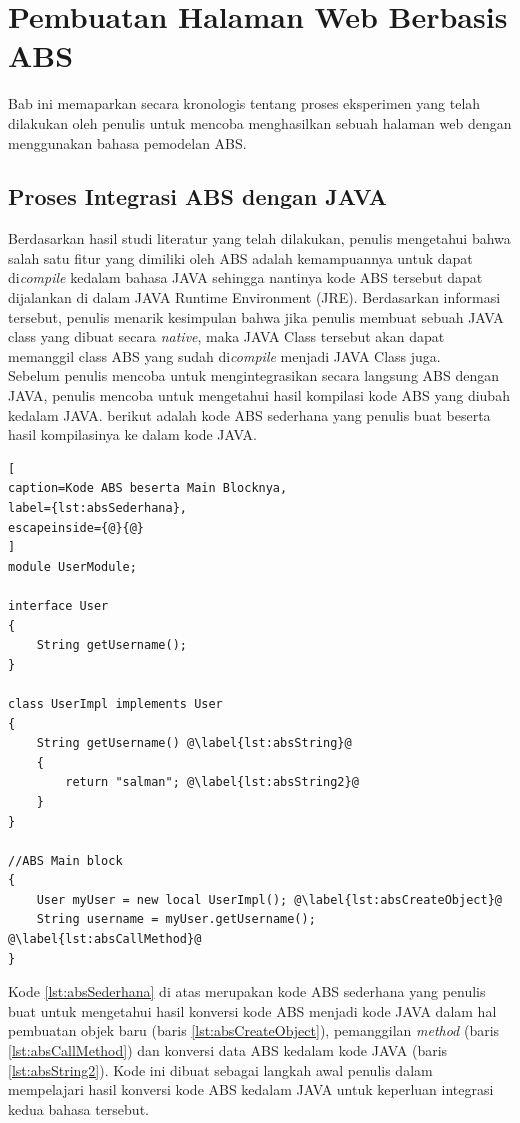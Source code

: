 \chapter{Pembuatan Halaman Web Berbasis ABS}

Bab ini memaparkan secara kronologis tentang proses eksperimen yang telah dilakukan oleh penulis untuk mencoba menghasilkan sebuah halaman web dengan menggunakan bahasa pemodelan ABS.

\section{Proses Integrasi ABS dengan JAVA}
Berdasarkan hasil studi literatur yang telah dilakukan, penulis mengetahui bahwa salah satu fitur yang dimiliki oleh ABS adalah kemampuannya untuk dapat di\textit{compile} kedalam bahasa JAVA sehingga nantinya kode ABS tersebut dapat dijalankan di dalam JAVA Runtime Environment (JRE). Berdasarkan informasi tersebut, penulis menarik kesimpulan bahwa jika penulis membuat sebuah JAVA class yang dibuat secara \textit{native}, maka JAVA Class tersebut akan dapat memanggil class ABS yang sudah di\textit{compile} menjadi JAVA Class juga.\\

Sebelum penulis mencoba untuk mengintegrasikan secara langsung ABS dengan JAVA, penulis mencoba untuk mengetahui hasil kompilasi kode ABS yang diubah kedalam JAVA. berikut adalah kode ABS sederhana yang penulis buat beserta hasil kompilasinya ke dalam kode JAVA.

\begin{lstlisting}[
caption=Kode ABS beserta Main Blocknya,
label={lst:absSederhana},
escapeinside={@}{@}
]
module UserModule;

interface User
{
	String getUsername();
}

class UserImpl implements User
{
	String getUsername() @\label{lst:absString}@
	{
		return "salman"; @\label{lst:absString2}@
	}
}

//ABS Main block
{
	User myUser = new local UserImpl(); @\label{lst:absCreateObject}@
	String username = myUser.getUsername(); @\label{lst:absCallMethod}@
}
\end{lstlisting}

Kode \ref{lst:absSederhana} di atas merupakan kode ABS sederhana yang penulis buat untuk mengetahui hasil konversi kode ABS menjadi kode JAVA dalam hal pembuatan objek baru (baris \ref{lst:absCreateObject}), pemanggilan \textit{method} (baris \ref{lst:absCallMethod}) dan konversi data ABS kedalam kode JAVA (baris \ref{lst:absString2}). Kode ini dibuat sebagai langkah awal penulis dalam mempelajari hasil konversi kode ABS kedalam JAVA untuk keperluan integrasi kedua bahasa tersebut.

